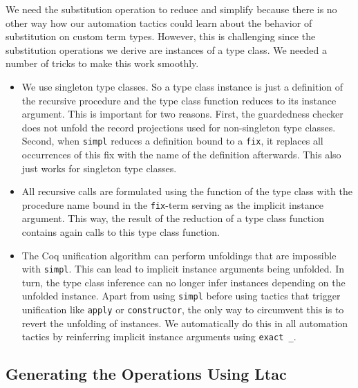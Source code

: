 \documentclass{scrartcl}
\newcommand{\lst}{\lstinline}
\begin{document}
We need the substitution operation to reduce and simplify because there is no other way how our automation tactics could learn about the behavior of substitution on custom term types. However, this is challenging since the substitution operations we derive are instances of a type class. We needed a number of tricks to make this work smoothly.
\begin{itemize}
\item We use singleton type classes. So a type class instance is just a definition of the recursive procedure and the type class function reduces to its instance argument. This is important for two reasons. 
First, the guardedness checker does not unfold the record projections used for non-singleton type classes.
Second, when \lst$simpl$ reduces a definition bound to a \lst$fix$, it replaces all occurrences of this fix with the name of the definition afterwards. This also just works for singleton type classes.
\item All recursive calls are formulated using the function of the type class with the procedure name bound in the \lst$fix$-term serving as the implicit instance argument. This way, the result of the reduction of a type class function contains again calls to this type class function.
\item The Coq unification algorithm can perform unfoldings that are impossible with \lst$simpl$. This can lead to implicit instance arguments being unfolded. In turn, the type class inference can no longer infer instances depending on the unfolded instance. Apart from using \lst$simpl$ before using tactics that trigger unification like \lst$apply$ or \lst$constructor$, the only way to circumvent this is to revert the unfolding of instances. We automatically do this in all automation tactics by reinferring implicit instance arguments using \lst$exact _$.

\end{itemize}

\subsection{Generating the Operations Using Ltac}
\label{sec:gener-ltac}
\end{document}
